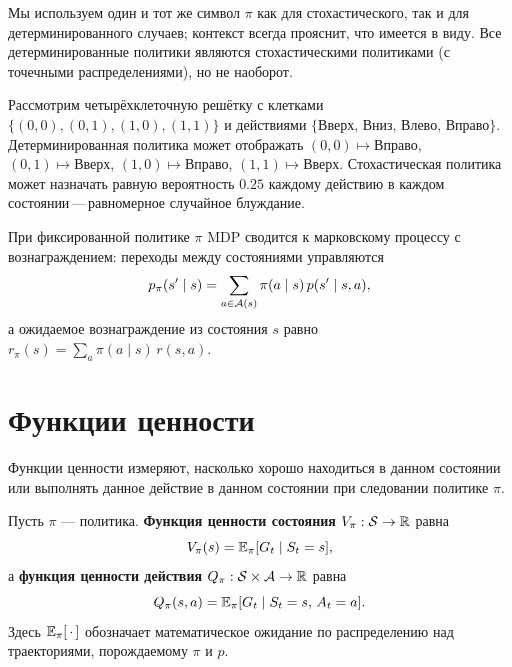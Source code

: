 \begin{remark}
Мы используем один и тот же символ $\pi$ как для стохастического, так и для детерминированного случаев; контекст всегда прояснит, что имеется в виду. Все детерминированные политики являются стохастическими политиками (с точечными распределениями), но не наоборот.
\end{remark}

\begin{example}
\label{ex:policy-gridworld}
Рассмотрим четырёхклеточную решётку с клетками $\{(0,0),(0,1),(1,0),(1,1)\}$ и действиями $\{\mbox{Вверх, Вниз, Влево, Вправо}\}$. Детерминированная политика может отображать $(0,0) \mapsto \mbox{Вправо}$, $(0,1) \mapsto \mbox{Вверх}$, $(1,0) \mapsto \mbox{Вправо}$, $(1,1)\mapsto\mbox{Вверх}$. Стохастическая политика может назначать равную вероятность $0.25$ каждому действию в каждом состоянии\,---\,равномерное случайное блуждание.
\end{example}

При фиксированной политике $\pi$ MDP сводится к марковскому процессу с вознаграждением: переходы между состояниями управляются
\[
p_\pi(s' \mid s) = \sum_{a \in \mathcal{A}(s)} \pi(a \mid s)\, p(s' \mid s, a),
\]
а ожидаемое вознаграждение из состояния $s$ равно $r_\pi(s) = \sum_{a} \pi(a \mid s)\, r(s, a)$.


\section{Функции ценности}
\label{sec:value-functions}

Функции ценности измеряют, насколько хорошо находиться в данном состоянии или выполнять данное действие в данном состоянии при следовании политике $\pi$.

\begin{definition}
\label{def:value-functions}
Пусть $\pi$ — политика. \textbf{Функция ценности состояния} $V_\pi : \mathcal{S} \to \mathbb{R}$ равна
\begin{equation}
\label{eq:state-value}
V_\pi(s) = \operatorname{\mathbb{E}}_\pi[G_t \mid S_t = s],
\end{equation}
а \textbf{функция ценности действия} $Q_\pi : \mathcal{S} \times \mathcal{A} \to \mathbb{R}$ равна
\begin{equation}
\label{eq:action-value}
Q_\pi(s, a) = \operatorname{\mathbb{E}}_\pi[G_t \mid S_t = s,\, A_t = a].
\end{equation}
Здесь $\operatorname{\mathbb{E}}_\pi[\,\cdot\,]$ обозначает математическое ожидание по распределению над траекториями, порождаемому $\pi$ и $p$.
\end{definition}

